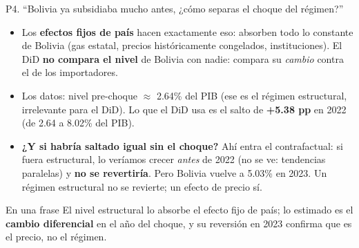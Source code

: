 \documentclass[aspectratio=169,10pt]{beamer}
\newcommand{\key}[1]{{\bfseries\color{AcentoRojo}#1}}
\begin{document}
\begin{frame}{P4. ``Bolivia ya subsidiaba mucho antes, ¿cómo separas el choque del régimen?''}
  \small
  \begin{itemize}
    \item Los \textbf{efectos fijos de país} hacen exactamente eso: absorben todo lo constante de
          Bolivia (gas estatal, precios históricamente congelados, instituciones). El DiD \textbf{no
          compara el nivel} de Bolivia con nadie: compara su \emph{cambio} contra el de los importadores.
    \item Los datos: nivel pre-choque $\approx$ 2.64\% del PIB (ese es el régimen estructural,
          irrelevante para el DiD). Lo que el DiD usa es el salto de \key{+5.38 pp} en 2022 (de 2.64
          a 8.02\% del PIB).
    \item \textbf{¿Y si habría saltado igual sin el choque?} Ahí entra el contrafactual: si fuera
          estructural, lo veríamos crecer \emph{antes} de 2022 (no se ve: tendencias paralelas) y
          \textbf{no se revertiría}. Pero Bolivia vuelve a 5.03\% en 2023. \alert{Un régimen
          estructural no se revierte; un efecto de precio sí.}
  \end{itemize}
  \begin{block}{En una frase}
    El nivel estructural lo absorbe el efecto fijo de país; lo estimado es el \textbf{cambio
    diferencial} en el año del choque, y su reversión en 2023 confirma que es el precio, no el régimen.
  \end{block}

\end{frame}
\end{document}
